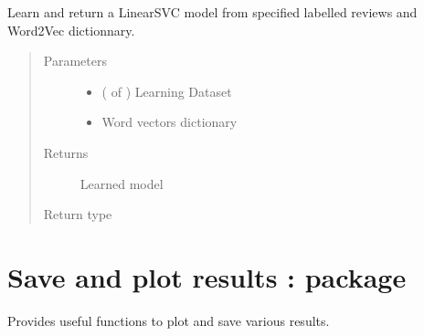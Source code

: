 \documentclass[letterpaper,10pt,english]{sphinxmanual}
\begin{document}

\begin{fulllineitems}
\label{\detokenize{learning:loacore.learning.svm.learn_model}}
Learn and return a LinearSVC model from specified labelled reviews and Word2Vec dictionnary.
\begin{quote}\begin{description}
\item[{Parameters}] \leavevmode\begin{itemize}
\item {} 
 ( of {\hyperref[\detokenize{classes:loacore.classes.classes.Review}]{}}) \textendash{} Learning Dataset

\item {} 
 \textendash{} Word vectors dictionary

\end{itemize}

\item[{Returns}] \leavevmode
Learned model

\item[{Return type}] \leavevmode



\end{description}\end{quote}

\end{fulllineitems}



\chapter{Save and plot results :  package}
\label{\detokenize{utils:save-and-plot-results-utils-package}}\label{\detokenize{utils::doc}}
Provides useful functions to plot and save various results.

\label{\detokenize{utils:module-loacore.utils.file_writer}}\label{\detokenize{utils:module-loacore.utils.plot_polarities}}
\end{document}
